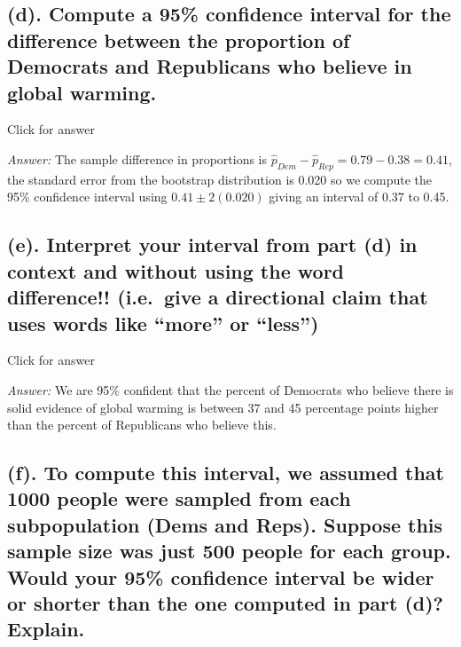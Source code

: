 \documentclass[
]{book}
\begin{document}
\hypertarget{d.-compute-a-95-confidence-interval-for-the-difference-between-the-proportion-of-democrats-and-republicans-who-believe-in-global-warming.}{%
\subsection{(d). Compute a 95\% confidence interval for the difference between the proportion of Democrats and Republicans who believe in global warming.}\label{d.-compute-a-95-confidence-interval-for-the-difference-between-the-proportion-of-democrats-and-republicans-who-believe-in-global-warming.}}

Click for answer

\emph{Answer:}
The sample difference in proportions is \(\hat{p}_{Dem} - \hat{p}_{Rep} = 0.79 - 0.38 = 0.41\), the standard error from the bootstrap distribution is 0.020 so we compute the 95\% confidence interval using \(0.41 \pm 2(0.020)\) giving an interval of 0.37 to 0.45.

\hypertarget{e.-interpret-your-interval-from-part-d-in-context-and-without-using-the-word-difference-i.e.-give-a-directional-claim-that-uses-words-like-more-or-less}{%
\subsection{(e). Interpret your interval from part (d) in context and without using the word difference!! (i.e.~give a directional claim that uses words like ``more'' or ``less'')}\label{e.-interpret-your-interval-from-part-d-in-context-and-without-using-the-word-difference-i.e.-give-a-directional-claim-that-uses-words-like-more-or-less}}

Click for answer

\emph{Answer:} We are 95\% confident that the percent of Democrats who believe there is solid evidence of global warming is between 37 and 45 percentage points higher than the percent of Republicans who believe this.

\hypertarget{f.-to-compute-this-interval-we-assumed-that-1000-people-were-sampled-from-each-subpopulation-dems-and-reps.-suppose-this-sample-size-was-just-500-people-for-each-group.-would-your-95-confidence-interval-be-wider-or-shorter-than-the-one-computed-in-part-d-explain.}{%
\subsection{(f). To compute this interval, we assumed that 1000 people were sampled from each subpopulation (Dems and Reps). Suppose this sample size was just 500 people for each group. Would your 95\% confidence interval be wider or shorter than the one computed in part (d)? Explain.}\label{f.-to-compute-this-interval-we-assumed-that-1000-people-were-sampled-from-each-subpopulation-dems-and-reps.-suppose-this-sample-size-was-just-500-people-for-each-group.-would-your-95-confidence-interval-be-wider-or-shorter-than-the-one-computed-in-part-d-explain.}}
\end{document}
